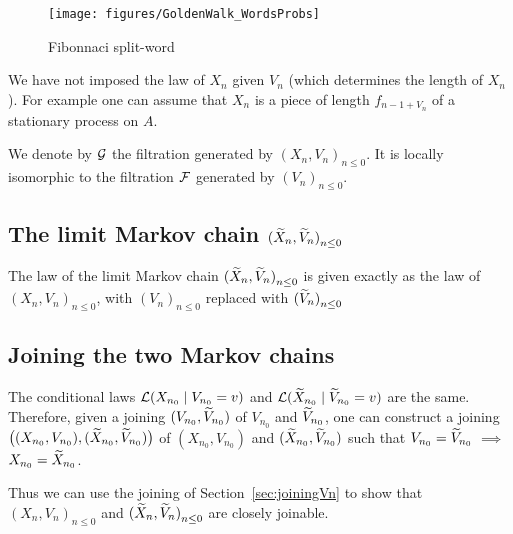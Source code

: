 \documentclass[12pt,a4paper]{article}
\begin{document}
\begin{figure}[!h]
\centering
	\texttt{[image: figures/GoldenWalk\_WordsProbs]}
\caption{Fibonnaci split-word}\label{fig:fibosw}
\end{figure}

We have not imposed the law of $X_n$ given $V_n$ (which determines 
the length of $X_n$). 
For example one can assume that $X_n$ is a piece of length $f_{n-1+V_n}$ of 
a stationary process on $A$. 

We denote by $\mathcal{G}$ the filtration generated by ${(X_n, V_n)}_{n \leq 0}$. 
It is locally isomorphic to the filtration $\mathcal{F}$ generated by ${(V_n)}_{n \leq 0}$.

\subsection{The limit Markov chain ${(\widetilde{X}_n, \widetilde{V}_n)}_{n \leq 0}$}

The law of the limit Markov chain ${(\widetilde{X}_n, \widetilde{V}_n)}_{n \leq 0}$ 
is given exactly as the law of ${(X_n, V_n)}_{n \leq 0}$, 
with ${(V_n)}_{n \leq 0}$ replaced with ${(\widetilde{V}_n)}_{n \leq 0}$


\subsection{Joining the two Markov chains}

The conditional laws $\mathcal{L}(X_{n_0} \mid V_{n_0}=v)$ and 
$\mathcal{L}(\widetilde{X}_{n_0} \mid \widetilde{V}_{n_0}=v)$ are the same. 
Therefore, given a joining $(V_{n_0}, \widetilde{V}_{n_0})$ of $V_{n_0}$ and $\widetilde{V}_{n_0}$, 
one can construct a joining 
$\bigl((X_{n_0}, V_{n_0}), (\widetilde{X}_{n_0}, \widetilde{V}_{n_0})\bigr)$ 
of $(X_{n_0}, V_{n_0})$ and $(\widetilde{X}_{n_0}, \widetilde{V}_{n_0})$ such that 
$V_{n_0} = \widetilde{V}_{n_0}$ $\implies$ $X_{n_0}=\widetilde{X}_{n_0}$. 

Thus we can use the joining of Section~\ref{sec:joiningVn} to show 
that ${(X_n, V_n)}_{n \leq 0}$ and ${(\widetilde{X}_n, \widetilde{V}_n)}_{n \leq 0}$ 
are closely joinable. 
\end{document}
